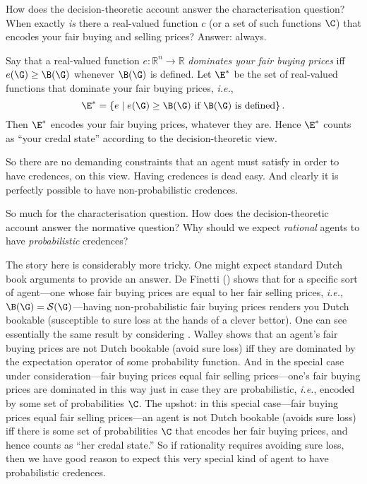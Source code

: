 How does the decision-theoretic account answer the characterisation question? When exactly \textit{is} there a real-valued function $c$ (or a set of such functions $\C$) that encodes your fair buying and selling prices? Answer: always.

Say that a real-valued function $e:\mathbb{R}^n\rightarrow\mathbb{R}$ \textit{dominates your fair buying prices} iff $e(\G)\geq\B(\G)$ whenever $\B(\G)$ is defined. Let $\E^*$ be the set of real-valued functions that dominate your fair buying prices, \textit{i.e.},
$$ \E^*=\left\{e \mathrel{|} e(\G)\geq\B(\G) \text{ if } \B(\G) \text{ is defined} \right\}. $$
Then $\E^*$ encodes your fair buying prices, whatever they are. Hence $\E^*$ counts as ``your credal state'' according to the decision-theoretic view.

So there are no demanding constraints that an agent must satisfy in order to have credences, on this view. Having credences is dead easy. And clearly it is perfectly possible to have non-probabilistic credences.

So much for the characterisation question. How does the decision-theoretic account answer the normative question? Why should we expect \textit{rational} agents to have \textit{probabilistic} credences? 

The story here is considerably more tricky. One might expect standard Dutch book arguments to provide an answer. De Finetti () shows that for a specific sort of agent---one whose fair buying prices are equal to her fair selling prices, \textit{i.e.}, $\B(\G)=\mathcal{S}(\G)$---having non-probabilistic fair buying prices renders you Dutch bookable (susceptible to sure loss at the hands of a clever bettor). One can see essentially the same result by considering \citep[3.3.3a]{Walley1991}. Walley shows that an agent's fair buying prices are not Dutch bookable (avoid sure loss) iff they are dominated by the expectation operator of some probability function. And in the special case under consideration---fair buying prices equal fair selling prices---one's fair buying prices are dominated in this way just in case they are probabilistic, \textit{i.e.}, encoded by some set of probabilities $\C$. The upshot: in this special case---fair buying prices equal fair selling prices---an agent is not Dutch bookable (avoids sure loss) iff there is some set of probabilities $\C$ that encodes her fair buying prices, and hence counts as ``her credal state.'' So if rationality requires avoiding sure loss, then we have good reason to expect this very special kind of agent to have probabilistic credences.

